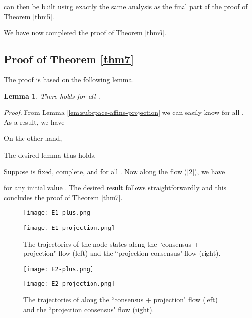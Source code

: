 \documentclass[a4paper, 11pt]{article}
\newtheorem{lemma}{Lemma}
\begin{document}
 can then be built using exactly the same analysis as the final part of the proof of Theorem \ref{thm5}.

We have now completed the proof of Theorem \ref{thm6}.






\subsection{Proof of Theorem \ref{thm7}}
The proof is based on the following lemma.

\begin{lemma}
There holds  for all .
\end{lemma}
{\it Proof.} From Lemma \ref{lem:subspace-affine-projection} we can easily know  for all . As a result, we have

On the other hand,

The desired lemma thus holds. \hfill

Suppose  is fixed, complete, and  for all . Now along the flow (\ref{2}), we have

for any  initial value  .  The desired result follows straightforwardly and this concludes the proof of Theorem \ref{thm7}.

\begin{figure*}
\begin{minipage}[t]{0.5\linewidth}
\centering
\texttt{[image: E1-plus.png]}
\end{minipage}\begin{minipage}[t]{0.5\linewidth}
\centering
\texttt{[image: E1-projection.png]}
\end{minipage}
\caption{The trajectories of the node states along the ``consensus + projection" flow (left) and the ``projection consensus" flow (right).}
\label{fig:fig1}
\end{figure*}

\begin{figure*}
\begin{minipage}[t]{0.5\linewidth}
\centering
\texttt{[image: E2-plus.png]}
\end{minipage}\begin{minipage}[t]{0.5\linewidth}
\centering
\texttt{[image: E2-projection.png]}
\end{minipage}
\caption{The trajectories of    along the ``consensus + projection" flow (left) and the ``projection consensus" flow (right).}
\label{fig:fig2}
\end{figure*}
\end{document}
